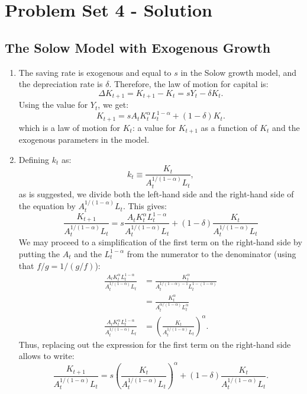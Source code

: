 \documentclass[]{book}
\theoremstyle{definition}
\theoremstyle{definition}
\theoremstyle{definition}
\theoremstyle{remark}
\begin{document}
\chapter*{Problem Set 4 - Solution}\label{problem-set-4---solution}

\section*{The Solow Model with Exogenous
Growth}\label{the-solow-model-with-exogenous-growth}

\begin{enumerate}
\def\labelenumi{\arabic{enumi}.}
\item
  The saving rate is exogenous and equal to \(s\) in the Solow growth
  model, and the depreciation rate is \(\delta\). Therefore, the law of
  motion for capital is: \[\Delta K_{t+1}=K_{t+1}-K_t=sY_t-\delta K_t.\]
  Using the value for \(Y_t\), we get:
  \[\boxed{K_{t+1}=s A_t K_t^{\alpha} L_t^{1-\alpha} + (1-\delta) K_t}.\]
  which is a law of motion for \(K_t\): a value for \(K_{t+1}\) as a
  function of \(K_t\) and the exogenous parameters in the model.
\item
  Defining \(k_t\) as: \[k_t\equiv\frac{K_t}{A_t^{1/(1-\alpha)} L_t},\]
  as is suggested, we divide both the left-hand side and the right-hand
  side of the equation by \(A_t^{1/(1-\alpha)} L_t\). This gives:
  \[\frac{K_{t+1}}{A_t^{1/(1-\alpha)} L_t}=s \frac{A_t K_t^{\alpha} L_t^{1-\alpha}}{A_t^{1/(1-\alpha)} L_t} + (1-\delta) \frac{K_t}{A_t^{1/(1-\alpha)} L_t}\]
  We may proceed to a simplification of the first term on the right-hand
  side by putting the \(A_t\) and the \(L_t^{1-\alpha}\) from the
  numerator to the denominator (using that \(f/g=1/(g/f)\)): \[
  \begin{aligned}
  \frac{A_t K_t^{\alpha} L_t^{1-\alpha}}{A_t^{1/(1-\alpha)} L_t}&=\frac{K_t^\alpha}{A_t^{1/(1-\alpha)-1}L_t^{1-(1-\alpha)}}\\
  &=\frac{K_t^\alpha}{A_t^{\alpha/(1-\alpha)}L_t^{\alpha}}\\
  \frac{A_t K_t^{\alpha} L_t^{1-\alpha}}{A_t^{1/(1-\alpha)} L_t}&=\left(\frac{K_t}{A_t^{1/(1-\alpha)}L_t}\right)^\alpha.
  \end{aligned}
  \] Thus, replacing out the expression for the first term on the
  right-hand side allows to write:
  \[\frac{K_{t+1}}{A_t^{1/(1-\alpha)} L_t}=s\left(\frac{K_t}{A_t^{1/(1-\alpha)}L_t}\right)^\alpha+(1-\delta)\frac{K_t}{A_t^{1/(1-\alpha)} L_t}.\]

\end{enumerate}
\end{document}
